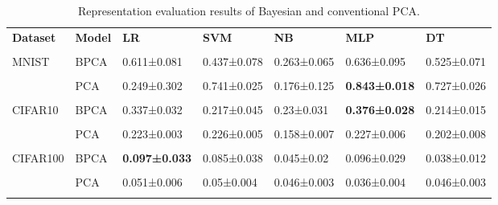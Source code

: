 \begin{table}[h]
    \centering
    \footnotesize
    \begin{tabular}{lllllll}\n\toprule\n  \textbf{Dataset} & \textbf{Model} &          \textbf{LR} &         \textbf{SVM} &          \textbf{NB} &         \textbf{MLP} &          \textbf{DT} \\\\\n\midrule\n    MNIST &  BPCA & 0.611±0.081 & 0.437±0.078 & 0.263±0.065 & 0.636±0.095 & 0.525±0.071 \\\\\n     &   PCA & 0.249±0.302 & 0.741±0.025 & 0.176±0.125 & \textbf{0.843±0.018} & 0.727±0.026 \\\\\n CIFAR10 &  BPCA & 0.337±0.032 & 0.217±0.045 &  0.23±0.031 & \textbf{0.376±0.028} & 0.214±0.015 \\\\\n  &   PCA & 0.223±0.003 & 0.226±0.005 & 0.158±0.007 & 0.227±0.006 & 0.202±0.008 \\\\\n CIFAR100 &  BPCA & \textbf{0.097±0.033} & 0.085±0.038 &  0.045±0.02 & 0.096±0.029 & 0.038±0.012 \\\\\n  &   PCA & 0.051±0.006 &  0.05±0.004 & 0.046±0.003 & 0.036±0.004 & 0.046±0.003 \\\\\bottomrule
    \end{tabular}
    \caption[Representations evaluation for BPCA and PCA]{Representation evaluation results of Bayesian and conventional PCA.}
    \label{tab:bpca}
\end{table}